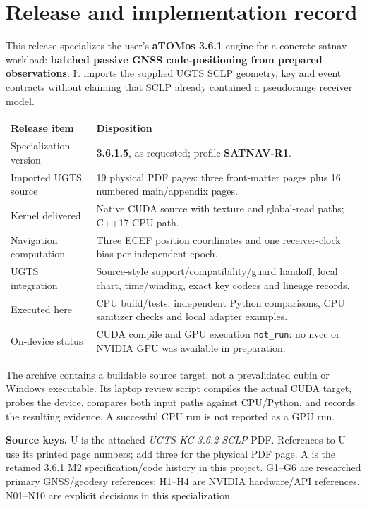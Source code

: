 \documentclass[11pt,a4paper]{article}
\newcommand{\code}[1]{\texttt{#1}}
\begin{document}
\section*{Release and implementation record}
This release specializes the user's \textbf{aTOMos 3.6.1} engine for a concrete satnav
workload: \textbf{batched passive GNSS code-positioning from prepared observations}.
It imports the supplied UGTS SCLP geometry, key and event contracts without claiming
that SCLP already contained a pseudorange receiver model.

\begin{center}
\begin{tabularx}{\textwidth}{@{}P{.30\textwidth}Y@{}}\toprule
\textbf{Release item} & \textbf{Disposition}\\\midrule
Specialization version & \textbf{3.6.1.5}, as requested; profile \textbf{SATNAV-R1}.\\
Imported UGTS source & 19 physical PDF pages: three front-matter pages plus 16 numbered main/appendix pages.\\
Kernel delivered & Native CUDA source with texture and global-read paths; C++17 CPU path.\\
Navigation computation & Three ECEF position coordinates and one receiver-clock bias per independent epoch.\\
UGTS integration & Source-style support/compatibility/guard handoff, local chart, time/winding, exact key codecs and lineage records.\\
Executed here & CPU build/tests, independent Python comparisons, CPU sanitizer checks and local adapter examples.\\
On-device status & CUDA compile and GPU execution \code{not\_run}: no nvcc or NVIDIA GPU was available in preparation.\\\bottomrule
\end{tabularx}
\end{center}

The archive contains a buildable source target, not a prevalidated cubin or Windows
executable. Its laptop review script compiles the actual CUDA target, probes the device,
compares both input paths against CPU/Python, and records the resulting evidence.
A successful CPU run is not reported as a GPU run.

\textbf{Source keys.} U is the attached \emph{UGTS-KC 3.6.2 SCLP} PDF. References to U
use its printed page numbers; add three for the physical PDF page. A is the retained
3.6.1 M2 specification/code history in this project. G1--G6 are researched primary
GNSS/geodesy references; H1--H4 are NVIDIA hardware/API references. N01--N10 are
explicit decisions in this specialization.
\end{document}
